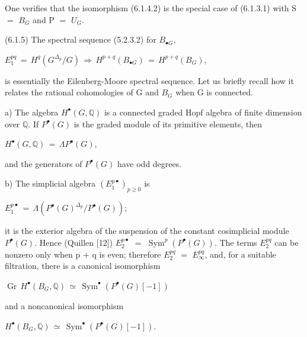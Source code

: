 \documentclass[11pt,twoside]{article}
\newcommand{\DFormula}[1]{%
  \par\smallskip\noindent\hspace*{0pt}\(\displaystyle #1\)\par\smallskip
}
\begin{document}
One verifies that the isomorphism (6.1.4.2) is the special case of (6.1.3.1) with S \(=\) \(B_{G}\) and P \(=\) \(U_{G}\).\par
\par\medskip
(6.1.5) The spectral sequence (5.2.3.2) for \(B_{\bullet G}\),\par
\par\medskip
\DFormula{E_{1}^{pq}\,=\,H^{q}(G^{\Delta _{p}}/G)\,\Rightarrow \,H^{p+q}(B_{\bullet G})\,=\,H^{p+q}(B_{G}),}
\par\medskip
is essentially the Eilenberg-Moore spectral sequence. Let us briefly recall how it relates the rational cohomologies of G and \(B_{G}\) when G is connected.\par
\par\medskip
a) The algebra \(H^{\bullet }(G,\mathbb{Q})\) is a connected graded Hopf algebra of finite dimension over \(\mathbb{Q}\). If \(P^{\bullet }(G)\) is the graded module of its primitive elements, then\par
\par\medskip
\DFormula{H^{\bullet }(G,\mathbb{Q})\,=\,\Lambda P^{\bullet }(G),}
\par\medskip
and the generators of \(P^{\bullet }(G)\) have odd degrees.\par
\par\medskip
b) The simplicial algebra \((E_{1}^{p\bullet })_{p\geq 0}\) is\par
\par\medskip
\DFormula{E_{1}^{p\bullet }\,=\,\Lambda (P^{\bullet }(G)^{\Delta _{p}}/P^{\bullet }(G));}
\par\medskip
it is the exterior algebra of the suspension of the constant cosimplicial module \(P^{\bullet }(G)\). Hence (Quillen [12]) \(E_{2}^{p\bullet }\) \(=\) \(\operatorname{Sym}^{p}(P^{\bullet }(G))\). The terms \(E_{2}^{pq}\) can be nonzero only when p \(+\) q is even; therefore \(E_{2}^{pq}\) \(=\) \(E_{\infty }^{pq}\), and, for a suitable filtration, there is a canonical isomorphism\par
\par\medskip
\DFormula{\operatorname{Gr}\,H^{\bullet }(B_{G},\mathbb{Q})\,\simeq \,\operatorname{Sym}^{\bullet }(P^{\bullet }(G)[−1])}
\par\medskip
and a noncanonical isomorphism\par
\par\medskip
\DFormula{H^{\bullet }(B_{G},\mathbb{Q})\,\simeq \,\operatorname{Sym}^{\bullet }(P^{\bullet }(G)[−1]).}
\par\medskip
\end{document}
